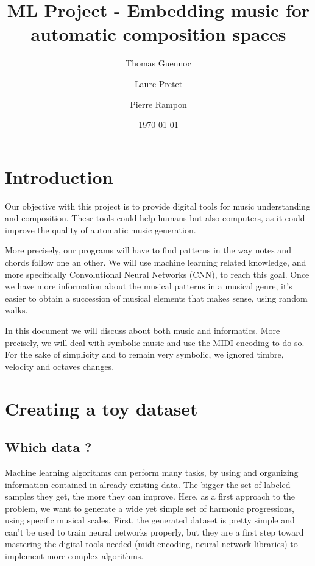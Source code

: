 \documentclass{article}
\title{ML Project - Embedding music for automatic composition spaces}
\author{Thomas Guennoc \and Laure Pretet \and Pierre Rampon }
\date{\today}
\begin{document}
\maketitle

\newpage

\tableofcontents

\newpage

\section{Introduction}

\hspace{0.5cm}Our objective with this project is to provide digital tools for music understanding and composition. These tools could help humans but also computers, as it could improve the quality of automatic music generation. 

\hspace{0.5cm}More precisely, our programs will have to find patterns in the way notes and chords follow one an other. We will use machine learning related knowledge, and more specifically Convolutional Neural Networks (CNN), to reach this goal. Once we have more information about the musical patterns in a musical genre, it's easier to obtain a succession of musical elements that makes sense, using random walks.

\hspace{0.5cm}In this document we will discuss about both music and informatics. More precisely, we will deal with symbolic music and use the MIDI encoding to do so. For the sake of simplicity and to remain very symbolic, we ignored timbre, velocity and octaves changes.

\section{Creating a toy dataset}
\subsection{Which data ?}

\hspace{0.5cm}Machine learning algorithms can perform many tasks, by using and organizing information contained in already existing data. The bigger the set of labeled samples they get, the more they can improve. Here, as a first approach to the problem, we want to generate a wide yet simple set of harmonic progressions, using specific musical scales. First, the generated dataset is pretty simple and can't be used to train neural networks properly, but they are a first step toward mastering the digital tools needed (midi encoding, neural network libraries) to implement more complex algorithms.
\end{document}
